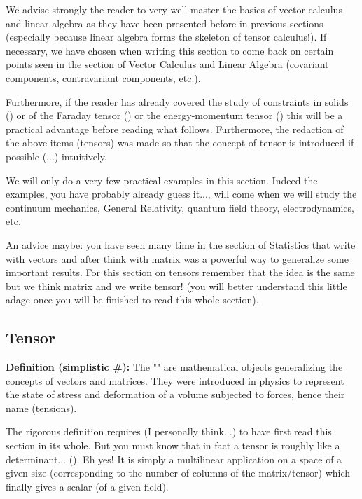 	We advise strongly the reader to very well master the basics of vector calculus and linear algebra as they have been presented before in previous sections (especially because linear algebra forms the skeleton of tensor calculus!). If necessary, we have chosen when writing this section to come back on certain points seen in the section of Vector Calculus and Linear Algebra (covariant components, contravariant components, etc.).
	
	Furthermore, if the reader has already covered the study of constraints in solids () or of the Faraday tensor () or the energy-momentum tensor () this will be a practical advantage before reading what follows. Furthermore, the redaction of the above items (tensors) was made so that the concept of tensor is  introduced if possible (...) intuitively.
	
	We will only do a very few practical examples in this section. Indeed the examples, you have probably already guess it..., will come when we will study the continuum mechanics, General Relativity, quantum field theory, electrodynamics, etc.
	
	An advice maybe: you have seen many time in the section of Statistics that write with vectors and after think with matrix was a powerful way to generalize some important results. For this section on tensors remember that the idea is the same but we think matrix and we write tensor! (you will better understand this little adage once you will be finished to read this whole section).
	
	\subsection{Tensor}
	\textbf{Definition (simplistic \#\mydef):} The "" are mathematical objects generalizing the concepts of vectors and matrices. They were introduced in physics to represent the state of stress and deformation of a volume subjected to forces, hence their name (tensions).
	
	The rigorous definition requires (I personally think...) to have first read this section in its whole. But you must know that in fact a tensor is roughly like a determinant... (). Eh yes! It is simply a multilinear application on a space of a given size (corresponding to the number of columns of the matrix/tensor) which finally gives a scalar (of a given field).
	

